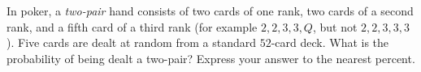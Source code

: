 In poker, a \emph{two-pair} hand consists of two cards of one rank, two cards of a second rank, and a fifth card of a third rank (for example $2,2,3,3,Q$, but not $2,2,3,3,3$). Five cards are dealt at random from a standard $52$-card deck. What is the probability of being dealt a two-pair? Express your answer to the nearest percent.
